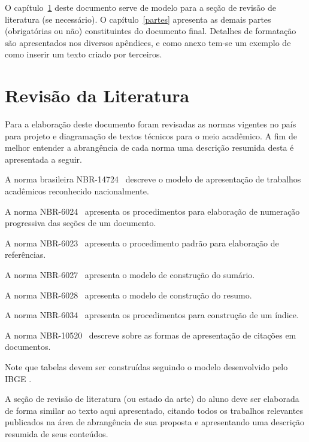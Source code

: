 \documentclass[repeatfields,xlists,xpacks,oneside,yearsonly]{ufrgscca}
\begin{document}
    O capítulo~\ref{revisao} deste documento serve de modelo para a seção de
    revisão de literatura (se necessário). O capítulo~\ref{partes} apresenta
       as demais partes (obrigatórias ou não) constituintes do documento final.
    Detalhes de formatação são apresentados nos diversos apêndices, e como anexo tem-se um exemplo de como inserir um texto criado por terceiros.

    \chapter{Revisão da Literatura}
    \label{revisao}

    Para a elaboração deste documento foram revisadas as normas vigentes no país
    para projeto e diagramação de textos técnicos para o meio acadêmico. A fim
    de melhor entender a abrangência de cada norma uma descrição resumida desta
    é apresentada a seguir.

    A norma brasileira NBR-14724~\cite{ABNT:NBR-14724-2011} descreve o modelo de
    apresentação de trabalhos acadêmicos reconhecido nacionalmente.

    A norma NBR-6024~\cite{ABNT:NBR-6024-2003}  apresenta os procedimentos para
    elaboração de numeração progressiva das seções de um documento.

    A norma  NBR-6023~\cite{ABNT:NBR-6023-2002} apresenta o procedimento padrão
    para elaboração de referências.

    A norma NBR-6027~\cite{ABNT:NBR-6027-2003} apresenta o modelo de construção do sumário.

    A norma NBR-6028~\cite{ABNT:NBR-6028-2003} apresenta o modelo de construção do resumo.

    A norma NBR-6034~\cite{ABNT:NBR-6034-2004} apresenta os procedimentos para construção de um índice.

    A norma NBR-10520~\cite{ABNT:NBR-10520-2002} descreve sobre as
    formas de apresentação de citações em documentos.


    Note que tabelas devem ser construídas seguindo o modelo desenvolvido pelo IBGE \cite{IBGE:tabular-1993}.


    A seção de revisão de literatura (ou estado da arte) do aluno deve ser
    elaborada de forma similar ao texto aqui apresentado, citando todos os
    trabalhos relevantes publicados na área de abrangência de sua proposta e
    apresentando uma descrição resumida de seus conteúdos.
\end{document}
